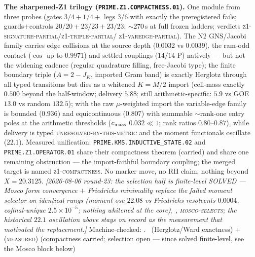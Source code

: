 \par\smallskip\noindent\textbf{The sharpened-Z1 trilogy
(\texttt{PRIME.Z1.COMPACTNESS.01}).}
One module from three probes (gates $3/4+1/4+$ legs $3/6$ with
exactly the preregistered fails; guards$+$controls
$20/20+23/23+23/23$; ${\sim}270$\,s at full frozen ladders;
verdicts \textsc{z1-signature-partial}/\textsc{z1-triple-partial}/%
\textsc{z1-varedge-partial}).  The N2 GNS/Jacobi family carries
edge collisions at the source depth ($0.0032$ vs $0.0039$), the
ram-odd contact ($\cos$ up to $0.9971$) and settled couplings
($14/14$ P) natively --- but not the widening cadence (regular
quadrature filling, free-Jacobi type); the finite boundary triple
($A=2-J_K$, imported Gram band) is exactly Herglotz through all
typed transitions but dies as a whitened $K=M/2$ import
(cell-mass exactly $0.500$ beyond the half-window; delivery
$5.88$; still arithmetic-specific: $5.9$ vs GOE $13.0$ vs random
$132.5$); with the raw $\mu$-weighted import the variable-edge
family is bounded ($0.936$) and equicontinuous ($0.807$) with
summable ${\sim}$rank-one entry poles at the arithmetic
thresholds ($c_{\rm mass}$ $0.032\ll1$; rank ratios
$0.80$--$0.87$), while delivery is typed
\textsc{unresolved-by-this-metric} and the moment functionals
oscillate ($22.1$).  Measured unification:
\texttt{PRIME.KMS.INDUCTIVE\_STATE.02} and
\texttt{PRIME.Z1.OPERATOR.01} share their compactness theorem
(carried) and share one remaining obstruction --- the
import-faithful boundary coupling; the merged target is named
\textsc{z1-compactness}.  No marker move, no RH claim, nothing
beyond $X=20.3125$.  \emph{[2026-08-06 round-23: the selection
half is finite-level SOLVED --- Mosco form convergence $+$
Friedrichs minimality replace the failed moment selector on
identical rungs (moment osc $22.08$ vs Friedrichs resolvents
$0.0004$, cofinal-unique $2.5\times10^{-5}$; nothing whitened at
the core), ,
\textsc{mosco-selects}; the historical $22.1$ oscillation above
stays on record as the measurement that motivated the
replacement.]}
Machine-checked: .
\mE\ (Herglotz/Ward exactness) $+$ (\textsc{measured})
(compactness carried; selection open --- since solved
finite-level, see the Mosco block below)
\par\smallskip


